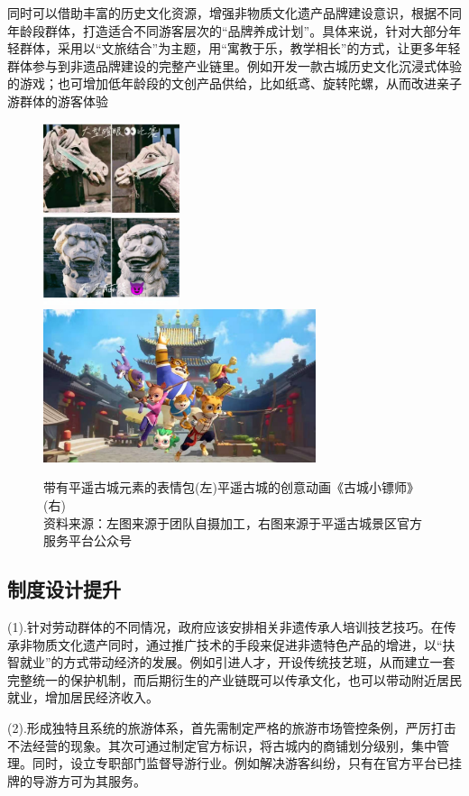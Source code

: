 \documentclass[UTF8]{ctexart}
\begin{document}
            同时可以借助丰富的历史文化资源，增强非物质文化遗产品牌建设意识，根据不同年龄段群体，打造适合不同游客层次的“品牌养成计划”。具体来说，针对大部分年轻群体，采用以“文旅结合”为主题，用“寓教于乐，教学相长”的方式，让更多年轻群体参与到非遗品牌建设的完整产业链里。例如开发一款古城历史文化沉浸式体验的游戏；也可增加低年龄段的文创产品供给，比如纸鸢、旋转陀螺，从而改进亲子游群体的游客体验
            \begin{figure}[H]
                \centering
                \includegraphics[width=4cm]{表情包.jpg}
                \includegraphics[width=8cm]{古城小镖师.jpg}
                \caption[plain]{带有平遥古城元素的表情包(左)平遥古城的创意动画《古城小镖师》(右)\\资料来源：左图来源于团队自摄加工，右图来源于平遥古城景区官方服务平台公众号}
        
            \end{figure}
    \subsection{制度设计提升}
    (1).针对劳动群体的不同情况，政府应该安排相关非遗传承人培训技艺技巧。在传承非物质文化遗产同时，通过推广技术的手段来促进非遗特色产品的增进，以“扶智就业”的方式带动经济的发展。例如引进人才，开设传统技艺班，从而建立一套完整统一的保护机制，而后期衍生的产业链既可以传承文化，也可以带动附近居民就业，增加居民经济收入。
    
    (2).形成独特且系统的旅游体系，首先需制定严格的旅游市场管控条例，严厉打击不法经营的现象。其次可通过制定官方标识，将古城内的商铺划分级别，集中管理。同时，设立专职部门监督导游行业。例如解决游客纠纷，只有在官方平台已挂牌的导游方可为其服务。
    
\end{document}
